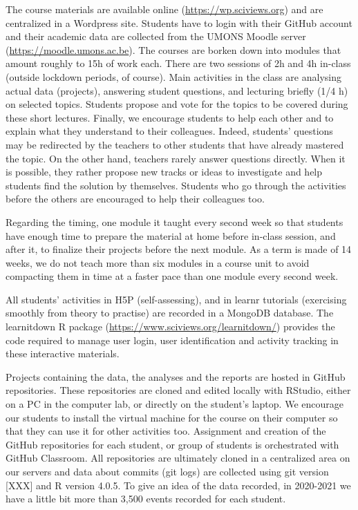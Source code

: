 \documentclass[
]{article}
\begin{document}
The course materials are available online
(\url{https://wp.sciviews.org}) and are centralized in a Wordpress site.
Students have to login with their GitHub account and their academic data
are collected from the UMONS Moodle server
(\url{https://moodle.umons.ac.be}). The courses are borken down into
modules that amount roughly to 15h of work each. There are two sessions
of 2h and 4h in-class (outside lockdown periods, of course). Main
activities in the class are analysing actual data (projects), answering
student questions, and lecturing briefly (1/4 h) on selected topics.
Students propose and vote for the topics to be covered during these
short lectures. Finally, we encourage students to help each other and to
explain what they understand to their colleagues. Indeed, students'
questions may be redirected by the teachers to other students that have
already mastered the topic. On the other hand, teachers rarely answer
questions directly. When it is possible, they rather propose new tracks
or ideas to investigate and help students find the solution by
themselves. Students who go through the activities before the others are
encouraged to help their colleagues too.

Regarding the timing, one module it taught every second week so that
students have enough time to prepare the material at home before
in-class session, and after it, to finalize their projects before the
next module. As a term is made of 14 weeks, we do not teach more than
six modules in a course unit to avoid compacting them in time at a
faster pace than one module every second week.

All students' activities in H5P (self-assessing), and in learnr
tutorials (exercising smoothly from theory to practise) are recorded in
a MongoDB database. The learnitdown R package
(\url{https://www.sciviews.org/learnitdown/}) provides the code required
to manage user login, user identification and activity tracking in these
interactive materials.

Projects containing the data, the analyses and the reports are hosted in
GitHub repositories. These repositories are cloned and edited locally
with RStudio, either on a PC in the computer lab, or directly on the
student's laptop. We encourage our students to install the virtual
machine for the course on their computer so that they can use it for
other activities too. Assignment and creation of the GitHub repositories
for each student, or group of students is orchestrated with GitHub
Classroom. All repositories are ultimately cloned in a centralized area
on our servers and data about commits (git logs) are collected using git
version {[}XXX{]} and R version 4.0.5. To give an idea of the data
recorded, in 2020-2021 we have a little bit more than 3,500 events
recorded for each student.
\end{document}
